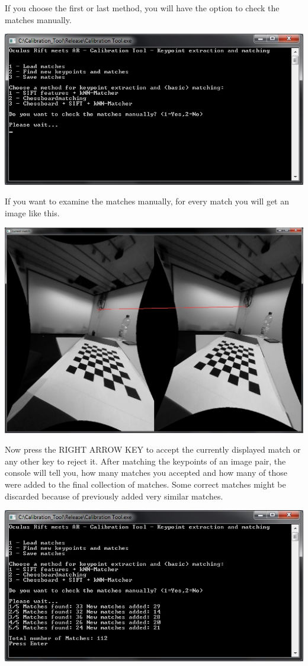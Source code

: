 \begin{enumerate}
  If you choose the first or last method, you will have the option to
  check the matches manually.
	
  \includegraphics*[width=.92\textwidth]{6.jpg}
	
  If you want to examine the matches manually, for every match you will
  get an image like this.
	
  \includegraphics*[width=.92\textwidth]{7.jpg}
	
  Now press the RIGHT ARROW KEY to accept the currently displayed match
  or any other key to reject it. After matching the keypoints of an
  image pair, the console will tell you, how many matches you accepted
  and how many of those were added to the final collection of matches.
  Some correct matches might be discarded because of previously added
  very similar matches.
	
  \includegraphics*[width=.92\textwidth]{8.jpg}
	

\end{enumerate}
